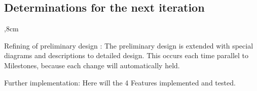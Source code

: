 \subsection{Determinations for the next iteration}

\begin{aims}
	,8cm
	\item[Refining of preliminary design :] The preliminary design is extended with special diagrams and descriptions to detailed design. This occurs each time  parallel to Milestones, because each change will automatically held.
		
		\item[Further implementation:] Here will the 4 Features implemented and tested.		
		
  
\end{aims}
